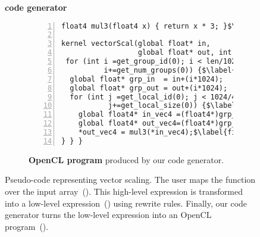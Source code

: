 \begin{figure}[t]
\begin{minipage}{0.1\linewidth}
\vspace{0pt}
\centering
{}
\end{minipage}
\begin{minipage}{0.26\linewidth}
\vspace{-5pt}
\centering
\textbf{code generator}
\end{minipage}
\begin{minipage}{0.1\linewidth}
\vspace{0pt}
\centering
{}
\end{minipage}

\begin{subfigure}[b]{\linewidth}
\centering
\begin{minipage}{.85\textwidth}
\begin{lstlisting}[mathescape,numbers=left]
float4 mul3(float4 x) { return x * 3; }$\label{fig:codeex:ocl:def}$

kernel vectorScal(global float* in,
                  global float* out, int len) {
 for (int i =get_group_id(0); i < len/1024;$\label{fig:codeex:ocl:loop1:start}$
          i+=get_num_groups(0)) {$\label{fig:codeex:ocl:loop1:end}$
  global float* grp_in  = in+(i*1024);
  global float* grp_out = out+(i*1024);
  for (int j =get_local_id(0); j < 1024/4;$\label{fig:codeex:ocl:loop2:start}$
           j+=get_local_size(0)) {$\label{fig:codeex:ocl:loop2:end}$
    global float4* in_vec4 =(float4*)grp_in+(j*4);
    global float4* out_vec4=(float4*)grp_out+(j*4);
    *out_vec4 = mul3(*in_vec4);$\label{fig:codeex:ocl:call}$
} } }  
\end{lstlisting}
\end{minipage}
\caption{\textbf{OpenCL program} produced by our code generator.}
\label{fig:codeex:ocl}
\end{subfigure}
\caption{
Pseudo-code representing vector scaling.
The user maps the  function over the input array~().
This high-level expression is transformed into a low-level expression~() using rewrite rules.
Finally, our code generator turns the low-level expression into an OpenCL program~().
}
  \label{fig:codeex}
\end{figure}

